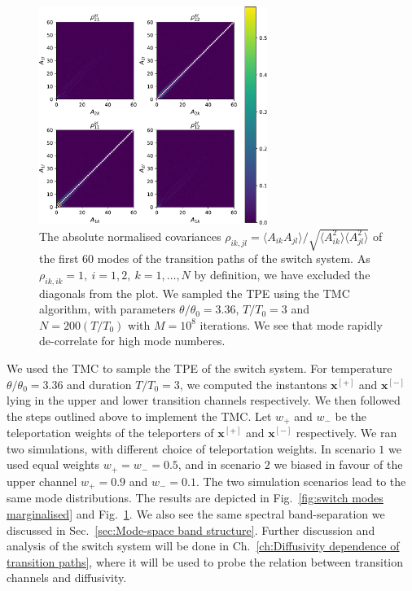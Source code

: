 \begin{figure}[t]
\includegraphics[width=0.66\textwidth]{figs_part1/mcmc/switch_covariance_no_diagonal}
\centering \caption{The absolute normalised covariances $\rho_{ik,jl} = \langle A_{ik} A_{jl} \rangle / \sqrt{ \langle A_{ik}^2 \rangle \langle A_{jl}^2 \rangle }$ of the first $60$ modes of the transition paths of the switch system. As $\rho_{ik,ik} = 1,\ i=1,2,\ k=1,\dots,N$ by definition, we have excluded the diagonals from the plot. We sampled the TPE using the TMC algorithm, with parameters $\theta/\theta_{0}=3.36$, $T/T_{0}=3$ and $N=200(T/T_{0})$ with $M=10^8$ iterations. We see that mode rapidly de-correlate for high mode numberes.}
\label{fig:switch modes covariance} 
\end{figure}

We used the TMC to sample the TPE of the switch system. For temperature $\theta/ \theta_0 = 3.36$ and duration $T/T_0 = 3$, we computed the instantons $\mathbf{x}^{[+]}$ and $\mathbf{x}^{[-]}$ lying in the upper and lower transition channels respectively. We then followed the steps outlined above to implement the TMC. Let $w_+$ and $w_-$ be the teleportation weights of the teleporters of $\mathbf{x}^{[+]}$ and $\mathbf{x}^{[-]}$ respectively. We ran two simulations, with different choice of teleportation weights. In scenario $1$ we used equal weights $w_+ = w_- = 0.5$, and in scenario $2$ we biased in favour of the upper channel $w_+ = 0.9$ and $w_- = 0.1$. The two simulation scenarios lead to the same mode distributions. The results are depicted in Fig.~\ref{fig:switch modes marginalised} and Fig.~\ref{fig:switch modes covariance}. We also see the same spectral band-separation we discussed in Sec.~\ref{sec:Mode-space band structure}. Further discussion and analysis of the switch system will be done in Ch.~\ref{ch:Diffusivity dependence of transition paths}, where it will be used to probe the relation between transition channels and diffusivity.

